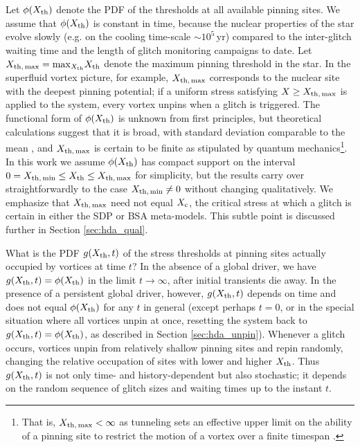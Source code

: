 Let $\phi(X_{\rm th})$ denote the PDF of the thresholds at all available pinning sites. We assume that $\phi(X_{\rm th})$ is constant in time, because the nuclear properties of the star evolve slowly (e.g. on the cooling time-scale $\sim10^5\,$yr) compared to the inter-glitch waiting time and the length of glitch monitoring campaigns to date. Let $X_{\rm th,\,max} = {\rm max}_{X_{\rm th}} X_{\rm th}$ denote the maximum pinning threshold in the star. In the superfluid vortex picture, for example, $X_{\rm th,\,max}$ corresponds to the nuclear site with the deepest pinning potential; if a uniform stress satisfying $X \geq X_{\rm th,\,max}$ is applied to the system, every vortex unpins when a glitch is triggered. The functional form of $\phi(X_{\rm th})$ is unknown from first principles, but theoretical calculations suggest that it is broad, with standard deviation comparable to the mean \citep{Jones1998, Donati2006, Avogadro2007}, and $X_{\rm th,\,max}$ is certain to be finite as stipulated by quantum mechanics\footnote{That is, $X_{\rm th,\,max} < \infty$ as tunneling sets an effective upper limit on the ability of a pinning site to restrict the motion of a vortex over a finite timespan \citep{Warszawski2013}.}. In this work we assume $\phi(X_{\rm th})$ has compact support on the interval $0 = X_{\rm th,\,min} \leq X_{\rm th} \leq X_{\rm th,\,max}$ for simplicity, but the results carry over straightforwardly to the case $X_{\rm th,\,min}\neq 0$ without changing qualitatively. We emphasize that $X_{\rm th,\,max}$ need not equal $X_\textrm{c}$, the critical stress at which a glitch is certain in either the SDP or BSA meta-models. This subtle point is discussed further in Section \ref{sec:hda_qual}.

What is the PDF $g(X_{\rm th}, t)$ of the stress thresholds at pinning sites actually occupied by vortices at time $t$? In the absence of a global driver, we have $g(X_{\rm th},t) = \phi(X_{\rm th})$ in the limit $t\rightarrow \infty$, after initial transients die away. In the presence of a persistent global driver, however, $g(X_{\rm th}, t)$ depends on time and does not equal $\phi(X_{\rm th})$ for any $t$ in general (except perhaps $t = 0$, or in the special situation where all vortices unpin at once, resetting the system back to $g(X_{\rm th}, t) = \phi(X_{\rm th})$, as described in Section \ref{sec:hda_unpin}). Whenever a glitch occurs, vortices unpin from relatively shallow pinning sites and repin randomly, changing the relative occupation of sites with lower and higher $X_{\rm th}$. Thus $g(X_{\rm th}, t)$ is not only time- and history-dependent but also stochastic; it depends on the random sequence of glitch sizes and waiting times up to the instant $t$.

